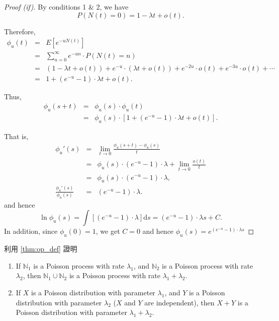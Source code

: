 \begin{theorem}[操作型定義]
\begin{proof}[Proof (if)]
By conditions 1 \& 2, we have
\[ P(N(t) = 0) = 1 - \lambda t + o(t). \]

Therefore,
\begin{eqnarray*}
\phi_{u}(t)
  & = & E[e^{-uN(t)}] \\
  & = & \sum_{n = 0}^{\infty} e^{-un} \cdot P(N(t) = n) \\
  & = & (1 - \lambda t + o(t)) + e^{-u} \cdot (\lambda t + o(t)) + e^{-2u} \cdot o(t) + e^{-3u} \cdot o(t) + \cdots \\
  & = & 1 + (e^{-u} - 1) \cdot \lambda t + o(t).
\end{eqnarray*}

Thus,
\begin{eqnarray*}
\phi_{u}(s + t)
  & = & \phi_{u}(s) \cdot \phi_{u}(t) \\
  & = & \phi_{u}(s) \cdot [1 + (e^{-u} - 1) \cdot \lambda t + o(t)].
\end{eqnarray*}

That is,
\begin{eqnarray*}
\phi_{u}'(s)
  & = & \lim_{t \to 0} \frac{\phi_{u}(s + t) - \phi_{u}(s)}{t} \\
  & = & \phi_{u}(s) \cdot (e^{-u} - 1) \cdot \lambda + \lim_{t \to 0} \frac{o(t)}{t} \\
  & = & \phi_{u}(s) \cdot (e^{-u} - 1) \cdot \lambda, \\
\frac{\phi_{u}'(s)}{\phi_{u}(s)}
  & = & (e^{-u} - 1) \cdot \lambda.
\end{eqnarray*}
and hence
\[ \ln \phi_{u}(s) = \int [(e^{-u} - 1) \cdot \lambda] \mathrm{d} s = (e^{-u} - 1) \cdot \lambda s + C. \]
In addition, since $ \phi_{u}(0) = 1 $, we get $ C = 0 $ and hence $ \phi_{u}(s) = e^{(e^{-u} - 1) \cdot \lambda s} $
\end{proof}
\end{theorem}

\begin{exercise}
利用 \autoref{thm:op_def} 證明
\begin{enumerate}
  \item If $ \mathbb{N}_{1} $ is a Poisson process with rate $ \lambda_{1} $, and $ \mathbb{N}_{2} $ is a Poisson process with rate $ \lambda_{2} $, then $ \mathbb{N}_{1} \cup \mathbb{N}_{2} $ is a Poisson process with rate $ \lambda_{1} + \lambda_{2} $.
  \item If $ X $ is a Poisson distribution with parameter $ \lambda_{1} $, and $ Y $ is a Poisson distribution with parameter $ \lambda_{2} $ ($ X $ and $ Y $ are independent), then $ X+Y $ is a Poisson distribution with parameter $ \lambda_{1} + \lambda_{2} $.
\end{enumerate}
\end{exercise}
